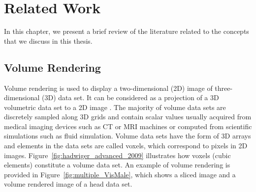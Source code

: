 \chapter{Related Work \label{related_work_chapter}}
In this chapter, we present a brief review of the literature related to the concepts that we discuss in this thesis.

\section{Volume Rendering \label{volume_rendering}}

Volume rendering is used to display a two-dimensional (2D) image of three-dimensional (3D) data set. It can be considered as a projection of a 3D volumetric data set to a 2D image \cite{garcia_parallel_2006}.
The majority of volume data sets are discretely sampled along 3D grids and contain scalar values usually acquired from medical imaging devices such as CT or MRI machines or computed from scientific simulations such as fluid simulation.
Volume data sets have the form of 3D arrays and elements in the data sets are called voxels, which correspond to pixels in 2D images.
Figure~\ref{fig:hadwiger_advanced_2009} illustrates how voxels (cubic elements) constitute a volume data set.
An example of volume rendering is provided in Figure~\ref{fig:multiple_VisMale}, which shows a sliced image and a volume rendered image of a head data set.

